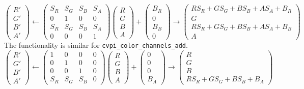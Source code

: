 \documentclass[12pt]{report}
\begin{document}
\[
 \begin{pmatrix} R' \\ G' \\ B' \\ A' \end{pmatrix}
          \gets \begin{pmatrix} S_R & S_G & S_B &
 S_A \\ 0 & 1 & 0 & 0 \\ S_R & S_G & S_B & S_A \\ 0 & 0 & 0 & 1 \end{pmatrix}
  \begin{pmatrix} R \\ G \\ B \\ A \end{pmatrix}
  + \begin{pmatrix} B_R \\ 0 \\ B_B \\ 0 \end{pmatrix} \to \begin{pmatrix} R S_R + G S_G + B S_B + A S_A
  + B_R \\ G \\ R S_R + G S_G + B S_B + A S_A + B_B \\ A \end{pmatrix}
\]
The functionality is similar for {\tt cvpi\_color\_channels\_add}.
   \[
 \begin{pmatrix} R' \\ G' \\ B' \\ A' \end{pmatrix}
          \gets \begin{pmatrix} 1 & 0 & 0 &
 0 \\ 0 & 1 & 0 & 0 \\ 0 & 0 & 1 & 0 \\ S_R & S_G & S_B & 0 \end{pmatrix}
  \begin{pmatrix} R \\ G \\ B \\ A \end{pmatrix}
  + \begin{pmatrix} 0 \\ 0 \\ 0 \\ B_A \end{pmatrix} \to \begin{pmatrix} R \\ G \\ B \\ R S_R + G S_G
  + B S_B + B_A \end{pmatrix}
\]
\end{document}
